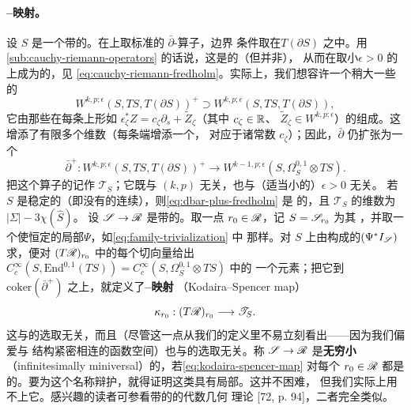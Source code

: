 \paragraph{\trKodaira--\trSpencer{}映射。}\label{sub:kodaira-spencer}
设 $S$ 是一个带\trStriplikeEnd{}的\trRiemann\trSurface。在\trTangentBundle{}上取标准的 $\bar{\partial}$-算子，边界
条件取在\trTotallyReal\trSubbundle{}$T(\partial S)$ 之中。用\cref{sub:cauchy-riemann-operators} 的话说，这是\trAdmissible{}的（但并非\trNondegenerate），
从而在取小\trWeight{}$\epsilon>0$ 的\trWeighted\trSobolevSpace{}上成为\trFredholm{}的，见
\eqref{eq:cauchy-riemann-fredholm}。实际上，我们想容许一个稍大一些的\trDomain
\begin{equation}\label{eq:enlarged-domain}
W^{k,p;\epsilon}(S,TS,T(\partial S))^{+}\supset W^{k,p;\epsilon}(S,TS,T(\partial S)),
\end{equation}
它由那些在每条\trStriplikeEnd{}上形如 $\epsilon_\zeta^*Z=c_\zeta\partial_s+\widetilde{Z}_\zeta$（其中 $c_\zeta\in\mathbb{R}$、
$\widetilde{Z}_\zeta\in W^{k,p;\epsilon}$）的\trVectorField{}组成。这增添了有限多个维数（每条端增添一个，
对应于诸常数 $c_\zeta$）；因此，$\bar{\partial}$ 仍扩张为一个\trFredholmOperator
\begin{equation}\label{eq:dbar-plus-fredholm}
\bar{\partial}^{+}:W^{k,p;\epsilon}(S,TS,T(\partial S))^{+}
\longrightarrow W^{k-1,p;\epsilon}(S,\Omega^{0,1}_{S}\otimes TS).
\end{equation}
把这个算子的\trCokernel{}记作 $\mathscr{T}_{S}$；它既与 $(k,p)$ 无关，也与（适当小的）$\epsilon>0$ 无关。
若 $S$ 是稳定的（即没有\trAutomorphism{}的连续\trFamily），则\eqref{eq:dbar-plus-fredholm} 是%
\trInjective{}的，且 $\mathscr{T}_{S}$ 的维数为 $|\Sigma|-3\chi(\hat{S})$。
设 $\mathscr{S}\to\mathscr{R}$ 是带\trStriplikeEnd{}的\trRiemann\trSurface\trFamily。取一点 $r_0\in\mathscr{R}$，记 $S=\mathscr{S}_{r_0}$ 为其%
\trFiber，并取一个使\trStriplikeEnd{}恒定的局部\trTrivialization{}$\Psi$，如\eqref{eq:family-trivialization} 中
那样。对 $S$ 上由\trPullback{}\trComplexStructure{}构成的\trFamily{}$(\Psi^*I_{\mathscr{S}})$ 求\trDifferential，便对 $(T\mathscr{R})_{r_0}$
中的每个切向量给出 $C^{\infty}_{c}(S,\mathrm{End}^{0,1}(TS))=C^{\infty}_{c}(S,\Omega^{0,1}_{S}\otimes TS)$ 中的
一个元素；把它\trProjection{}到 $\mathrm{coker}(\bar{\partial}^{+})$ 之上，就定义了\textbf{\trKodaira--\trSpencer{}映射}%
（Kodaira–Spencer map）
\begin{equation}\label{eq:kodaira-spencer-map}
\kappa_{r_0}:(T\mathscr{R})_{r_0}\longrightarrow\mathscr{T}_{S}.
\end{equation}
这与\trTrivialization{}的选取无关，而且（尽管这一点从我们的定义里不易立刻看出——因为我们偏爱与%
\trStriplikeEnd{}结构紧密相连的函数空间）也与\trStriplikeEnd{}的选取无关。称 $\mathscr{S}\to\mathscr{R}$ 是\textbf{无穷小%
\trMiniversal}（infinitesimally miniversal）的，若\eqref{eq:kodaira-spencer-map} 对每个 $r_0\in\mathscr{R}$ 都是%
\trBijective{}的。要为这个名称辩护，就得证明这类\trFamily{}具有局部\trVersality。这并不困难，
但我们实际上用不上它。感兴趣的读者可参看带\trMarkedPoint{}的\trRiemann\trSurface{}的代数几何%
\trDeformation{}理论 [72, p. 94]，二者完全类似。
